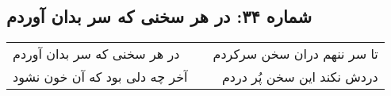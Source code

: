 \begin{center}
\section*{شماره ۳۴: در هر سخنی که سر بدان آوردم}
\label{sec:034}
\begin{longtable}{l p{0.5cm} r}
در هر سخنی که سر بدان آوردم
&&
تا سر ننهم دران سخن سرکردم
\\
آخر چه دلی بود که آن خون نشود
&&
دردش نکند این سخن پُر دردم
\\
\end{longtable}
\end{center}
